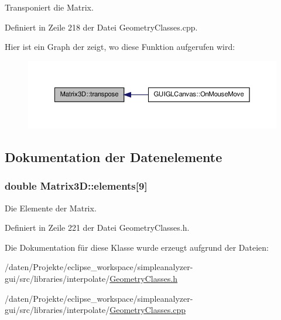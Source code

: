Transponiert die Matrix. 



Definiert in Zeile 218 der Datei Geometry\-Classes.\-cpp.



Hier ist ein Graph der zeigt, wo diese Funktion aufgerufen wird\-:\nopagebreak
\begin{figure}[H]
\begin{center}
\leavevmode
\includegraphics[width=350pt]{classMatrix3D_a0d59cb6ea927264477a10b9d427966d6_icgraph}
\end{center}
\end{figure}




\subsection{Dokumentation der Datenelemente}
\hypertarget{classMatrix3D_aa24b85b09060684ec1559f22857ccfee}{
\subsubsection[{elements}]{\setlength{\rightskip}{0pt plus 5cm}double Matrix3\-D\-::elements\mbox{[}9\mbox{]}\hspace{0.3cm}{\ttfamily [private]}}}\label{classMatrix3D_aa24b85b09060684ec1559f22857ccfee}


Die Elemente der Matrix. 



Definiert in Zeile 221 der Datei Geometry\-Classes.\-h.



Die Dokumentation für diese Klasse wurde erzeugt aufgrund der Dateien\-:\begin{DoxyCompactItemize}
\item 
/daten/\-Projekte/eclipse\-\_\-workspace/simpleanalyzer-\/gui/src/libraries/interpolate/\hyperlink{GeometryClasses_8h}{Geometry\-Classes.\-h}\item 
/daten/\-Projekte/eclipse\-\_\-workspace/simpleanalyzer-\/gui/src/libraries/interpolate/\hyperlink{GeometryClasses_8cpp}{Geometry\-Classes.\-cpp}\end{DoxyCompactItemize}
